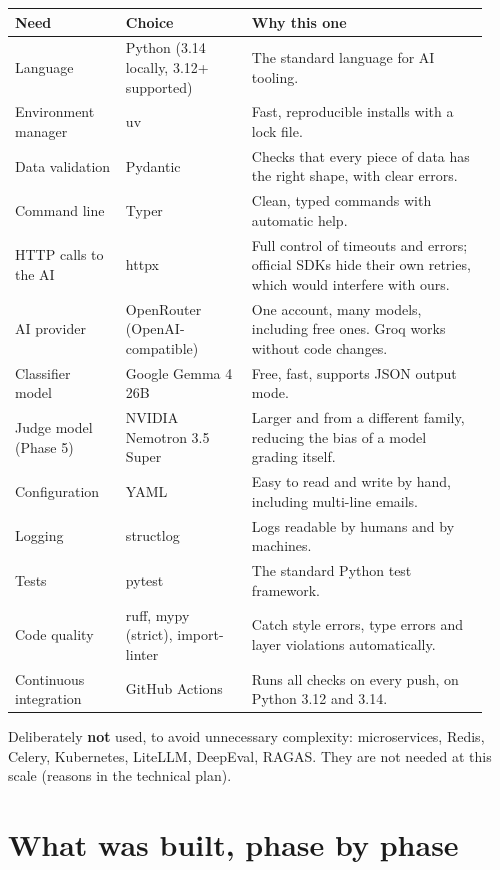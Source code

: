 \documentclass[11pt,a4paper]{article}
\begin{document}
\begin{longtable}{@{}p{0.22\linewidth}p{0.25\linewidth}p{0.47\linewidth}@{}}
\toprule
\textbf{Need} & \textbf{Choice} & \textbf{Why this one} \\
\midrule
\endhead
Language & Python (3.14 locally, 3.12+ supported) & The standard language for AI tooling. \\
Environment manager & uv & Fast, reproducible installs with a lock file. \\
Data validation & Pydantic & Checks that every piece of data has the right shape, with clear errors. \\
Command line & Typer & Clean, typed commands with automatic help. \\
HTTP calls to the AI & httpx & Full control of timeouts and errors; official SDKs hide their own retries, which would interfere with ours. \\
AI provider & OpenRouter (OpenAI-compatible) & One account, many models, including free ones. Groq works without code changes. \\
Classifier model & Google Gemma 4 26B & Free, fast, supports JSON output mode. \\
Judge model (Phase 5) & NVIDIA Nemotron 3.5 Super & Larger and from a different family, reducing the bias of a model grading itself. \\
Configuration & YAML & Easy to read and write by hand, including multi-line emails. \\
Logging & structlog & Logs readable by humans and by machines. \\
Tests & pytest & The standard Python test framework. \\
Code quality & ruff, mypy (strict), import-linter & Catch style errors, type errors and layer violations automatically. \\
Continuous integration & GitHub Actions & Runs all checks on every push, on Python 3.12 and 3.14. \\
\bottomrule
\end{longtable}

Deliberately \textbf{not} used, to avoid unnecessary complexity: microservices, Redis, Celery,
Kubernetes, LiteLLM, DeepEval, RAGAS. They are not needed at this scale (reasons in the
technical plan).

\section{What was built, phase by phase}
\end{document}
